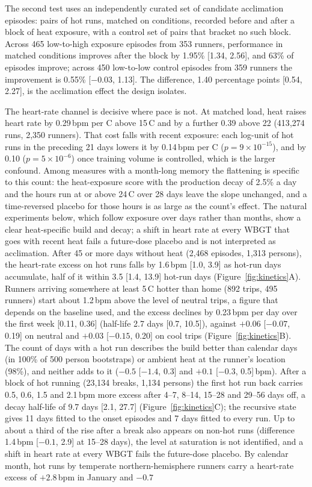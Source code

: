 \documentclass[11pt]{article}
\renewcommand{\_}{\textunderscore\allowbreak}
\begin{document}
The second test uses an independently curated set of candidate acclimation episodes: pairs of hot runs, matched on conditions, recorded before and after a block of heat exposure, with a control set of pairs that bracket no such block. Across 465 low-to-high exposure episodes from 353 runners, performance in matched conditions improves after the block by 1.95\% [1.34, 2.56], and 63\% of episodes improve; across 450 low-to-low control episodes from 359 runners the improvement is 0.55\% [$-0.03$, 1.13]. The difference, 1.40 percentage points [0.54, 2.27], is the acclimation effect the design isolates.

The heart-rate channel is decisive where pace is not. At matched load, heat raises heart rate by 0.29\,bpm per \textdegree C above 15\,\textdegree C and by a further 0.39 above 22 (413{,}274 runs, 2{,}350 runners). That cost falls with recent exposure: each log-unit of hot runs in the preceding 21 days lowers it by 0.14\,bpm per \textdegree C ($p = 9\times10^{-15}$), and by 0.10 ($p = 5\times10^{-6}$) once training volume is controlled, which is the larger confound. Among measures with a month-long memory the flattening is specific to this count: the heat-exposure score with the production decay of 2.5\% a day and the hours run at or above 24\,\textdegree C over 28 days leave the slope unchanged, and a time-reversed placebo for those hours is as large as the count's effect. The natural experiments below, which follow exposure over days rather than months, show a clear heat-specific build and decay; a shift in heart rate at every WBGT that goes with recent heat fails a future-dose placebo and is not interpreted as acclimation. After 45 or more days without heat (2{,}468 episodes, 1{,}313 persons), the heart-rate excess on hot runs falls by 1.6\,bpm [1.0, 3.9] as hot-run days accumulate, half of it within 3.5 [1.4, 13.9] hot-run days (Figure~\ref{fig:kinetics}A). Runners arriving somewhere at least 5\,\textdegree C hotter than home (892 trips, 495 runners) start about 1.2\,bpm above the level of neutral trips, a figure that depends on the baseline used, and the excess declines by 0.23\,bpm per day over the first week [0.11, 0.36] (half-life 2.7 days [0.7, 10.5]), against $+0.06$ [$-0.07$, 0.19] on neutral and $+0.03$ [$-0.15$, 0.20] on cool trips (Figure~\ref{fig:kinetics}B). The count of days with a hot run describes the build better than calendar days (in 100\% of 500 person bootstraps) or ambient heat at the runner's location (98\%), and neither adds to it ($-0.5$ [$-1.4$, 0.3] and $+0.1$ [$-0.3$, 0.5]\,bpm). After a block of hot running (23{,}134 breaks, 1{,}134 persons) the first hot run back carries 0.5, 0.6, 1.5 and 2.1\,bpm more excess after 4--7, 8--14, 15--28 and 29--56 days off, a decay half-life of 9.7 days [2.1, 27.7] (Figure~\ref{fig:kinetics}C); the recursive state gives 11 days fitted to the onset episodes and 7 days fitted to every run. Up to about a third of the rise after a break also appears on non-hot runs (difference 1.4\,bpm [$-0.1$, 2.9] at 15--28 days), the level at saturation is not identified, and a shift in heart rate at every WBGT fails the future-dose placebo. By calendar month, hot runs by temperate northern-hemisphere runners carry a heart-rate excess of $+2.8$\,bpm in January and $-0.7$ 
\end{document}
